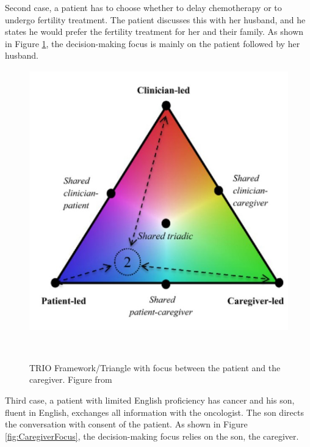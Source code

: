 \documentclass{sigchi}
\begin{document}
Second case, a patient has to choose whether to delay chemotherapy or to undergo fertility treatment. The patient discusses this with her husband, and he states he would prefer the fertility treatment for her and their family. As shown in Figure \ref{fig:PatientFocus}, the decision-making focus is mainly on the patient followed by her husband.

\raggedbottom

\begin{figure}[H]
\centering
  \includegraphics[width=0.9\columnwidth]{figures/Triangle2Screenshotjpg.jpg}
  \caption{TRIO Framework/Triangle with focus between the patient and the caregiver. Figure from}~\label{fig:PatientFocus}
\end{figure}

Third case, a patient with limited English proficiency has cancer and his son, fluent in English, exchanges all information with the oncologist. The son directs the conversation with consent of the patient. As shown in Figure \ref{fig:CaregiverFocus}, the decision-making focus relies on the son, the caregiver.
\end{document}
